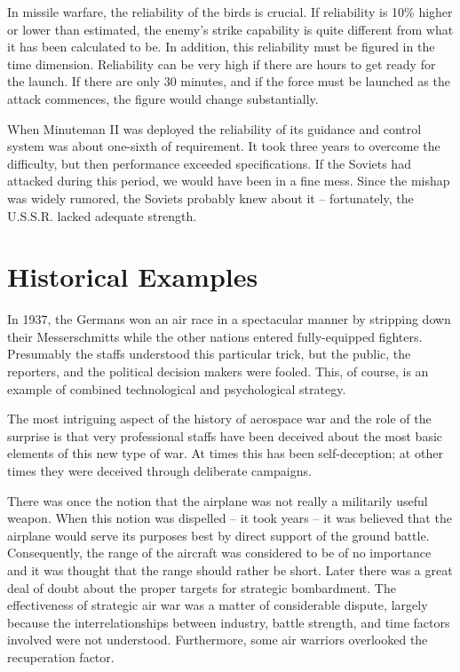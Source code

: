 In missile warfare, the reliability of the birds is crucial. If reliability is 10\% higher or lower than estimated, the enemy's strike capability is quite different from what it has been calculated to be. In addition, this reliability must be figured in the time dimension. Reliability can be very high if there are hours to get ready for the launch. If there are only 30 minutes, and if the force must be launched as the attack commences, the figure would change substantially.

When Minuteman II was deployed the reliability of its guidance and control system was about one-sixth of requirement. It took three years to overcome the difficulty, but then performance exceeded specifications. If the Soviets had attacked during this period, we would have been in a fine mess. Since the mishap was widely rumored, the Soviets probably knew about it -- fortunately, the U.S.S.R. lacked adequate strength.

\section{Historical Examples}
In 1937, the Germans won an air race in a spectacular manner by stripping down their Messerschmitts while the other nations entered fully-equipped fighters. Presumably the staffs understood this particular trick, but the public, the reporters, and the political decision makers were fooled. This, of course, is an example of combined technological and psychological strategy.

The most intriguing aspect of the history of aerospace war and the role of the surprise is that very professional staffs have been deceived about the most basic elements of this new type of war. At times this has been self-deception; at other times they were deceived through deliberate campaigns.

There was once the notion that the airplane was not really a militarily useful weapon. When this notion was dispelled -- it took years -- it was believed that the airplane would serve its purposes best by direct support of the ground battle. Consequently, the range of the aircraft was considered to be of no importance and it was thought that the range should rather be short. Later there was a great deal of doubt about the proper targets for strategic bombardment. The effectiveness of strategic air war was a matter of considerable dispute, largely because the interrelationships between industry, battle strength, and time factors involved were not understood. Furthermore, some air warriors overlooked the recuperation factor.

